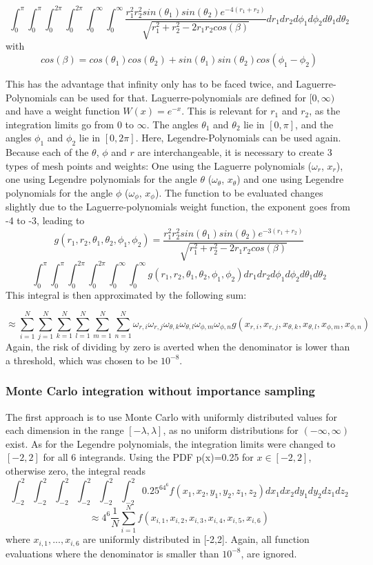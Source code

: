 \documentclass[10pt,a4paper]{article}
\begin{document}
$$
\int_
{0}^{\pi}\int_{0}^{\pi}\int_{0}^{2\pi}\int_{0}^{2\pi}\int_{0}^{\infty}\int_{0}^{\infty}
\frac{r_1^2r_2^2sin(\theta_1)sin(\theta_2)e^{-4(r_1+r_2)}}{\sqrt{r_1^2+r_2^2-2r_1r_2cos(\beta)}}dr_1dr_2d\phi_1d\phi_2d\theta_1d\theta_2
$$
with
$$
cos(\beta)=cos(\theta_1)cos(\theta_2)+sin(\theta_1)sin(\theta_2)cos(\phi_1-\phi_2)
$$

This has the advantage that infinity only has to be faced twice, and Laguerre-Polynomials can be used for that. Laguerre-polynomials are defined for $[0,\infty)$ and have a weight function $W(x)=e^{-x}$. This is relevant for $r_1$ and $r_2$, as the integration limits go from $0$ to $\infty$. The angles $\theta_1$ and $\theta_2$ lie in $[0,\pi]$, and the angles $\phi_1$ and $\phi_2$  lie in $[0,2\pi]$. Here, Legendre-Polynomials can be used again. Because each of the $\theta$, $\phi$ and $r$ are interchangeable, it is necessary to create 3 types of mesh points and weights: One using the Laguerre polynomials  ($\omega_r$, $x_r$), one using Legendre polynomials for the angle $\theta$ ($\omega_\theta$, $x_\theta$) and one using Legendre polynomials for the angle $\phi$ ($\omega_\phi$, $x_\phi$). The function to be evaluated changes slightly due to the Laguerre-polynomials weight function, the exponent goes from -4 to -3, leading to
$$g(r_1,r_2,\theta_1,\theta_2,\phi_1,\phi_2)=\frac{r_1^2r_2^2sin(\theta_1)sin(\theta_2)e^{-3(r_1+r_2)}}{\sqrt{r_1^2+r_2^2-2r_1r_2cos(\beta)}}$$
$$\int_{0}^{\pi}\int_{0}^{\pi}\int_{0}^{2\pi}\int_{0}^{2\pi}\int_{0}^{\infty}\int_{0}^{\infty}
g(r_1,r_2,\theta_1,\theta_2,\phi_1,\phi_2)dr_1dr_2d\phi_1d\phi_2d\theta_1d\theta_2$$
This integral is then approximated by the following sum:

$$
\approx \sum_{i=1}^N \sum_{j=1}^N \sum_{k=1}^N \sum_{l=1}^N \sum_{m=1}^N \sum_{n=1}^N \omega_{r,i} \omega_{r,j} \omega_{\theta ,k} \omega_{\theta ,l} \omega_{\phi ,m} \omega_{\phi ,n} g(x_{r,i},x_{r,j},x_{\theta ,k},x_{\theta ,l},x_{\phi ,m},x_{\phi ,n})
$$
Again, the risk of dividing by zero is averted when the denominator  is lower than a threshold, which was chosen to be $10^{-8}.$
\subsubsection{Monte Carlo integration without importance sampling}
The first approach is to use Monte Carlo with uniformly distributed values for each dimension in the range $[-\lambda,\lambda]$, as no uniform distributions for $(-\infty,\infty)$ exist. As for the Legendre polynomials, the integration limits were changed  to $[-2,2]$ for all 6 integrands. Using the PDF p(x)=0.25 for $x\in [-2,2]$, otherwise zero, the integral reads 
$$\int_{-2}^{2}\int_{-2}^{2}\int_{-2}^{2}\int_{-2}^{2}\int_{-2}^{2}\int_{-2}^{2}0.25^64^6f(x_1,x_2,y_1,y_2,z_1,z_2)dx_1dx_2dy_1dy_2dz_1dz_2$$
$$\approx4^6\frac{1}{N}\sum_{i=1}^{N}f(x_{i,1},x_{i,2},x_{i,3},x_{i,4},x_{i,5},x_{i,6})$$
where $x_{i,1},...,x_
{i,6}$ are uniformly distributed in  [-2,2]. Again, all function evaluations where the denominator is smaller than $10^{-8}$, are ignored.
\end{document}
